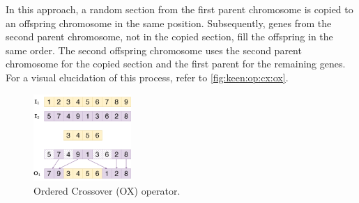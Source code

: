 In this approach, a random section from the first parent chromosome is copied 
to an offspring chromosome in the same position. Subsequently, genes from the 
second parent chromosome, not in the copied section, fill the offspring in 
the same order. The second offspring chromosome uses the second parent 
chromosome for the copied section and the first parent for the remaining 
genes. For a visual elucidation of this process, refer to 
\vref{fig:keen:op:cx:ox}.

\begin{figure}[ht!]
    \centering
    \includegraphics[width=0.33\textwidth]{img/keen/OX.png}
    \caption{Ordered Crossover (OX) operator.}
    \label{fig:keen:op:cx:ox}
\end{figure}

